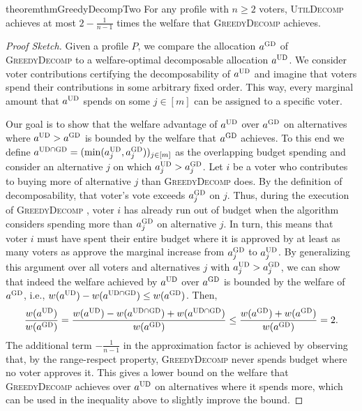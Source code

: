 \documentclass[11pt]{article}
\newcommand{\optd}{\textsc{UD}}
\newcommand{\GrdDec}{\textsc{GreedyDecomp} }
\newcommand{\GrdDecs}{\textsc{GD} }%
\newcommand{\UtDec}{\textsc{UtilDecomp} }
\begin{document}
\begin{restatable}{theorem}{thmGreedyDecompTwo}\label{thm:greedy-decomp-two}
    For any profile with $n \ge 2$ voters, \UtDec achieves at most $2-\frac{1}{n-1}$ times the welfare that \GrdDec achieves. 
\end{restatable}


\begin{proof}[Proof Sketch]
    
    Given a profile $P$, we compare the allocation $a^\GrdDecs$ of \GrdDec to a welfare-optimal decomposable allocation $a^\optd$. We consider voter contributions certifying the decomposability of $a^\optd$ and imagine that voters spend their contributions in some arbitrary fixed order. This way, every marginal amount that $a^\optd$ spends on some $j \in [m]$ can be assigned to a specific voter.
    
    Our goal is to show that the welfare advantage of $a^\optd$ over $a^\GrdDecs$ on alternatives where $a^\optd > a^\GrdDecs$ is bounded by the welfare that $a^\GrdDecs$ achieves. To this end we %
    define $a^{\optd \cap \GrdDecs} = (\min(a^{\optd}_j, a^{\GrdDecs}_j))_{j \in [m]}$ as the overlapping budget spending and consider an alternative $j$ on which $a^\optd_j > a^\GrdDecs_j$. Let $i$ be a voter who contributes to buying more of alternative $j$ than \GrdDec does. By the definition of decomposability, that voter's vote exceeds $a^\GrdDecs_j$ on $j$. Thus, during the execution of \GrdDec, voter $i$ has already run out of budget when the algorithm considers spending more than $a^\GrdDecs_j$ on alternative $j$. In turn, this means that voter $i$ must have spent their entire budget where it is approved by at least as many voters as approve the marginal increase from $a^\GrdDecs_j$ to $a^\optd_j$. By generalizing this argument over all voters and alternatives $j$ with $a^\optd_j > a^\GrdDecs_j$, we can show that indeed the welfare achieved by $a^\optd$ over $a^\GrdDecs$ is bounded by the welfare of $a^\GrdDecs$, i.e., $w(a^\optd) - w(a^{\optd \cap \GrdDecs}) \le w(a^\GrdDecs)$. Then,
    \begin{align*}
        \frac{w(a^\optd)}{w(a^\GrdDecs)} = \frac{w(a^\optd) - w(a^{\optd \cap \GrdDecs}) + w(a^{\optd \cap \GrdDecs})}{w(a^\GrdDecs)} \le \frac{w(a^\GrdDecs) + w(a^\GrdDecs)}{w(a^\GrdDecs)} = 2.
    \end{align*}
    The additional term $-\frac{1}{n-1}$ in the approximation factor is achieved by observing that, by the range-respect property, \GrdDec never spends budget where no voter approves it. This gives a lower bound on the welfare that \GrdDec achieves over $a^\optd$ on alternatives where it spends more, which can be used in the inequality above to slightly improve the bound.
\end{proof}
\end{document}
